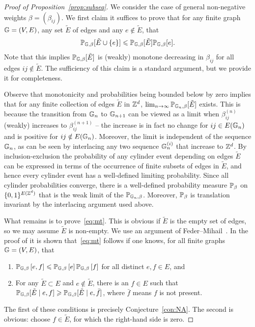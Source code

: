 \documentclass[11pt]{amsart}
\numberwithin{equation}{section}
\numberwithin{theorem}{section}
\newcommand{\cb}[1]{\left[#1\right ]} %
\begin{document}
\begin{proof}[Proof of Proposition~\ref{prop:subseq}]
    We consider the case of general non-negative weights
    $\beta=(\beta_{ij})$. We first claim it suffices to prove that for any
    finite graph $\bbG=(V,E)$, any set $\tilde E$ of edges and any
    $e\notin \tilde E$, that
    \begin{equation}
      \label{eq:mt}
      \P_{\bbG,\beta}\q{\tilde E\cup \{e\}} \leq \P_{\bbG,\beta}\q{\tilde E}\P_{\bbG,\beta}\q{e}.
    \end{equation}
    Note that this implies $\P_{\bbG,\beta}\q{\tilde E}$ is (weakly)
    monotone decreasing in $\beta_{ij}$ for all edges
    $ij\notin \tilde E$. The sufficiency of this claim is a standard
    argument, but we provide it for completeness.
    
    Observe that monotonicity and probabilities being bounded below by
    zero implies that for any finite collection of edges $\tilde E$ in
    $\Z^{d}$, $\lim_{n\to\infty}\P_{\bbG_{n},\beta}\q{\tilde E}$
    exists. This is because the transition from $\bbG_{n}$ to $\bbG_{n+1}$
    can be viewed as a limit when $\beta^{(n)}_{ij}$ (weakly)
    increases to $\beta^{(n+1)}_{ij}$ -- the increase is in fact no
    change for $ij\in E(\bbG_{n})$ and is positive for
    $ij\notin E(\bbG_{n})$.  Moreover, the limit is independent of the
    sequence $\bbG_{n}$, as can be seen by interlacing any two sequence
    $\bbG^{(i)}_{n}$ that increase to $\Z^{d}$. By inclusion-exclusion
    the probability of any cylinder event depending on edges $\tilde E$
    can be expressed in terms of the occurrence of finite subsets of
    edges in $\tilde E$, and hence every cylinder event has a
    well-defined limiting probability. Since all cylinder
    probabilities converge, there is a well-defined probability measure
    $\P_{\beta}$ on $\{0,1\}^{E(\Z^{d})}$ that is the weak limit of
    the $\P_{\bbG_{n},\beta}$. Moreover, $\P_{\beta}$ is translation invariant by the
    interlacing argument used above.

    What remains is to prove~\eqref{eq:mt}. This is obvious if
    $\tilde E$ is the empty set of edges, so we may assume $\tilde E$
    is non-empty. We use an argument of Feder--Mihail~\cite{FM}.  In
    the proof of \cite[Lemma~3.2]{FM} it is shown that~\eqref{eq:mt}
    follows if one knows, for all finite graphs $\bbG=(V,E)$, that
    \begin{enumerate}
    \item $\P_{\bbG,\beta}\cb{e,f} \leq \P_{\bbG,\beta}\cb{e}\P_{\bbG,\beta}\cb{f}$
      for all distinct $e,f\in E$, and
    \item For any $\tilde E\subset E$ and $e\notin \tilde E$, there is
      an $f\in E$ such that $\P_{\bbG,\beta}\q{\tilde E\mid e,f} \geq
      \P_{\bbG,\beta}\q{\tilde E\mid e,\bar{f}}$, where $\bar{f}$ means $f$
      is not present.
    \end{enumerate}
    The first of these conditions is precisely
    Conjecture~\ref{con:NA}. The second is obvious: choose $f\in
    \tilde E$, for which the right-hand side is zero.
\end{proof}
\end{document}
